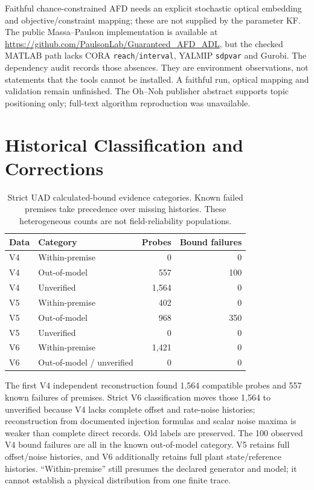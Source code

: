 \documentclass[10pt,journal]{IEEEtran}
\begin{document}
Faithful chance-constrained AFD needs an explicit stochastic optical embedding and objective/constraint mapping; these are not supplied by the parameter KF. The public Massa--Paulson implementation is available at \url{https://github.com/PaulsonLab/Guaranteed_AFD_ADL}, but the checked MATLAB path lacks CORA \texttt{reach}/\texttt{interval}, YALMIP \texttt{sdpvar} and Gurobi. The dependency audit records those absences. They are environment observations, not statements that the tools cannot be installed. A faithful run, optical mapping and validation remain unfinished. The Oh--Noh publisher abstract supports topic positioning only; full-text algorithm reproduction was unavailable.

\section{Historical Classification and Corrections}
\begin{table}[t]
\caption{Strict UAD calculated-bound evidence categories. Known failed premises take precedence over missing histories. These heterogeneous counts are not field-reliability populations.}
\centering\footnotesize
\begin{tabular}{llrr}\toprule
Data & Category & Probes & Bound failures\\\midrule
V4 & Within-premise & 0 & 0\\
V4 & Out-of-model & 557 & 100\\
V4 & Unverified & 1,564 & 0\\
V5 & Within-premise & 402 & 0\\
V5 & Out-of-model & 968 & 350\\
V5 & Unverified & 0 & 0\\
V6 & Within-premise & 1,421 & 0\\
V6 & Out-of-model / unverified & 0 & 0\\\bottomrule
\end{tabular}
\end{table}

The first V4 independent reconstruction found 1,564 compatible probes and 557 known failures of premises. Strict V6 classification moves those 1,564 to unverified because V4 lacks complete offset and rate-noise histories; reconstruction from documented injection formulas and scalar noise maxima is weaker than complete direct records. Old labels are preserved. The 100 observed V4 bound failures are all in the known out-of-model category. V5 retains full offset/noise histories, and V6 additionally retains full plant state/reference histories. ``Within-premise'' still presumes the declared generator and model; it cannot establish a physical distribution from one finite trace.
\end{document}
